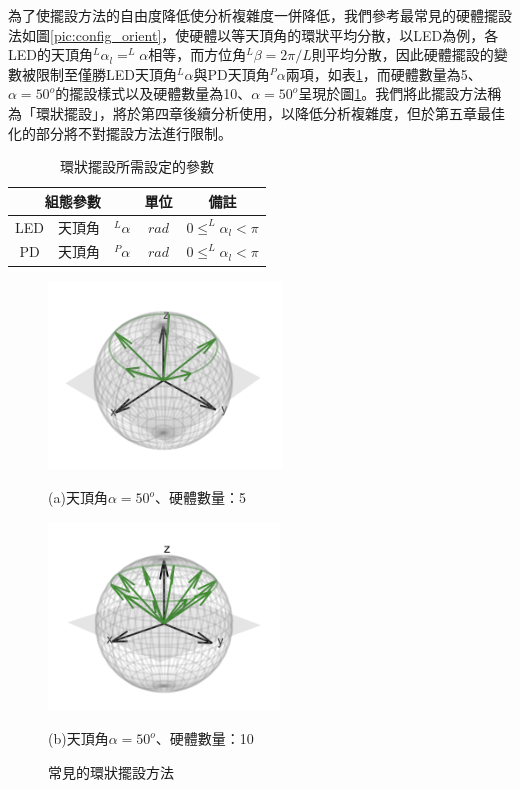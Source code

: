 為了使擺設方法的自由度降低使分析複雜度一併降低，我們參考最常見的硬體擺設法如圖\ref{pic:config_orient}，使硬體以等天頂角的環狀平均分散，以LED為例，各LED的天頂角$^L\alpha_l = ^L\alpha$相等，而方位角$^L\beta = 2\pi/L$則平均分散，因此硬體擺設的變數被限制至僅勝LED天頂角$^L\alpha$與PD天頂角$^P\alpha$兩項，如表\ref{tab:para_restrict_config}，而硬體數量為5、$\alpha=50^o$的擺設樣式以及硬體數量為10、$\alpha=50^o$呈現於圖\ref{pic:config_a}。我們將此擺設方法稱為「環狀擺設」，將於第四章後續分析使用，以降低分析複雜度，但於第五章最佳化的部分將不對擺設方法進行限制。

\begin{table}[htpb]
    \caption{環狀擺設所需設定的參數}
    \label{tab:para_restrict_config}
    \centering
    \begin{tabular}{|c|cc|c|c|}
    \hline
    \multicolumn{3}{|c|}{\textbf{組態參數}}  &\textbf{單位}  &  \textbf{備註}   \\
    \hline
    {LED} 
    & 天頂角 &$^L \alpha$ & $rad$ & $0\leq ^L \alpha_l<\pi$ \\\hline
    {PD} 
    & 天頂角 &$^P \alpha$ & $rad$ & $0\leq ^L \alpha_l<\pi$ \\\hline

    \end{tabular}
\end{table}

\begin{figure}[htpb]
    \centering
    \begin{minipage}{.5\textwidth}
        \centering
        \includegraphics[height=5cm]{ch4pic/config_a.png}
        \captionsetup{labelformat=empty}
        \caption*{(a)天頂角$\alpha=50^o$、硬體數量：5}
    \end{minipage}%
    \begin{minipage}{0.5\textwidth}
        \centering
        \includegraphics[height=5cm]{ch4pic/config_b.png}
        \captionsetup{labelformat=empty}
        \caption*{(b)天頂角$\alpha=50^o$、硬體數量：10}
    \end{minipage}
    \caption{常見的環狀擺設方法}
    \label{pic:config_a}
\end{figure}



